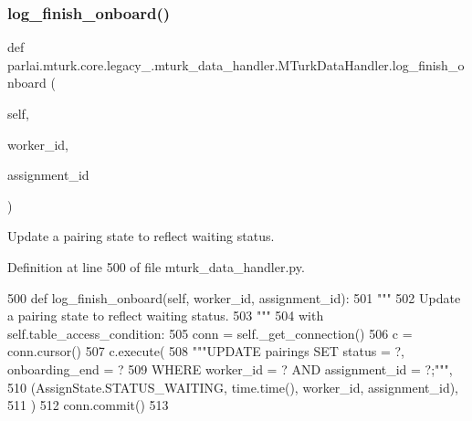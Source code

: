 \subsubsection{\texorpdfstring{log\+\_\+finish\+\_\+onboard()}{log\_finish\_onboard()}}
{\footnotesize\ttfamily def parlai.\+mturk.\+core.\+legacy\+\_.\+mturk\+\_\+data\+\_\+handler.\+M\+Turk\+Data\+Handler.\+log\+\_\+finish\+\_\+onboard (\begin{DoxyParamCaption}\item[{}]{self,  }\item[{}]{worker\+\_\+id,  }\item[{}]{assignment\+\_\+id }\end{DoxyParamCaption})}

\begin{DoxyVerb}Update a pairing state to reflect waiting status.
\end{DoxyVerb}
 

Definition at line 500 of file mturk\+\_\+data\+\_\+handler.\+py.


\begin{DoxyCode}
500     \textcolor{keyword}{def }log\_finish\_onboard(self, worker\_id, assignment\_id):
501         \textcolor{stringliteral}{"""}
502 \textcolor{stringliteral}{        Update a pairing state to reflect waiting status.}
503 \textcolor{stringliteral}{        """}
504         with self.table\_access\_condition:
505             conn = self.\_get\_connection()
506             c = conn.cursor()
507             c.execute(
508                 \textcolor{stringliteral}{"""UPDATE pairings SET status = ?, onboarding\_end = ?}
509 \textcolor{stringliteral}{                         WHERE worker\_id = ? AND assignment\_id = ?;"""},
510                 (AssignState.STATUS\_WAITING, time.time(), worker\_id, assignment\_id),
511             )
512             conn.commit()
513 
\end{DoxyCode}
\mbox{\label{classparlai_1_1mturk_1_1core_1_1legacy__2018_1_1mturk__data__handler_1_1MTurkDataHandler_a1b7db2687208e1af513fa590a6380779}} 
